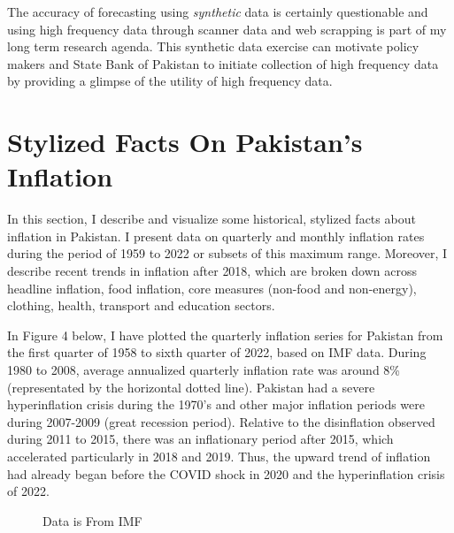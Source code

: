 \documentclass[12pt]{article}
\newcommand{\1}{\mathbbm 1}
\begin{document}
		The accuracy of forecasting using \textit{synthetic} data is certainly questionable and using high frequency data through scanner data and web scrapping is part of my long term research agenda. This synthetic data exercise can motivate policy makers and State Bank of Pakistan to initiate collection of high frequency data by providing a glimpse of the utility of high frequency data.
		
		
		
		
		
		
		
		
		
		
		
		
		\section{Stylized Facts On Pakistan's Inflation}
		
		In this section, I describe and visualize some historical, stylized facts about inflation in Pakistan. I present data on quarterly and monthly inflation rates during the period of 1959 to 2022 or subsets of this maximum range. Moreover, I describe recent trends in inflation after 2018, which are broken down across headline inflation, food inflation, core measures (non-food and non-energy), clothing, health, transport and education sectors.
		
		In Figure 4 below, I have plotted the quarterly inflation series for Pakistan from the first quarter of 1958 to sixth quarter of 2022, based on IMF data. During 1980 to 2008, average annualized quarterly inflation rate was around 8\% (representated by the horizontal dotted line). Pakistan had a severe hyperinflation crisis during the 1970's and other major inflation periods were during 2007-2009 (great recession period). Relative to the disinflation observed during 2011 to 2015, there was an inflationary period after 2015, which accelerated particularly in 2018 and 2019. Thus, the upward trend of inflation had already began before the COVID shock in 2020 and the hyperinflation crisis of 2022.
		
		
		
		
		
		
		
		
		
		\begin{figure}[H]
			\centering
			\scalebox{0.6}{}
			\hfill
			\caption{Data is From IMF}
		\end{figure}
		
\end{document}
